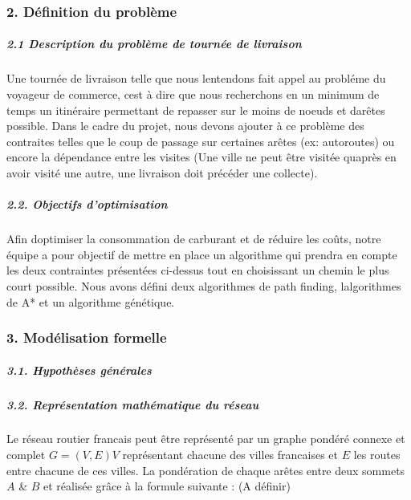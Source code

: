 \protect{}\label{398a6f6d}
\subsubsection{2. Définition du
problème}\label{2-duxe9finition-du-probluxe8me}

\subparagraph{2.1 Description du problème de tournée de
livraison}\label{21-description-du-probluxe8me-de-tournuxe9e-de-livraison}

Une tournée de livraison telle que nous l\textquotesingle entendons fait
appel au probléme du voyageur de commerce, c\textquotesingle est à dire
que nous recherchons en un minimum de temps un itinéraire permettant de
repasser sur le moins de noeuds et d\textquotesingle arêtes possible.
Dans le cadre du projet, nous devons ajouter à ce problème des
contraites telles que le coup de passage sur certaines arêtes (ex:
autoroutes) ou encore la dépendance entre les visites (Une ville ne peut
être visitée qu\textquotesingle après en avoir visité une autre, une
livraison doit précéder une collecte).

\subparagraph{2.2. Objectifs
d'optimisation}\label{22-objectifs-doptimisation}

Afin d\textquotesingle optimiser la consommation de carburant et de
réduire les coûts, notre équipe a pour objectif de mettre en place un
algorithme qui prendra en compte les deux contraintes présentées
ci-dessus tout en choisissant un chemin le plus court possible. Nous
avons défini deux algorithmes de path finding,
l\textquotesingle algorithmes de A* et un algorithme génétique.

\protect{}\label{ec4a7404}
\subsubsection{3. Modélisation
formelle}\label{3-moduxe9lisation-formelle}

\subparagraph{3.1. Hypothèses
générales}\label{31-hypothuxe8ses-guxe9nuxe9rales}

\subparagraph{3.2. Représentation mathématique du
réseau}\label{32-repruxe9sentation-mathuxe9matique-du-ruxe9seau}

Le réseau routier francais peut être représenté par un graphe pondéré
connexe et complet \(G = (V,E) V\) représentant chacune des villes
francaises et \(E\) les routes entre chacune de ces villes. La
pondération de chaque arêtes entre deux sommets \(A\) \& \(B\) et
réalisée grâce à la formule suivante : (A définir)

